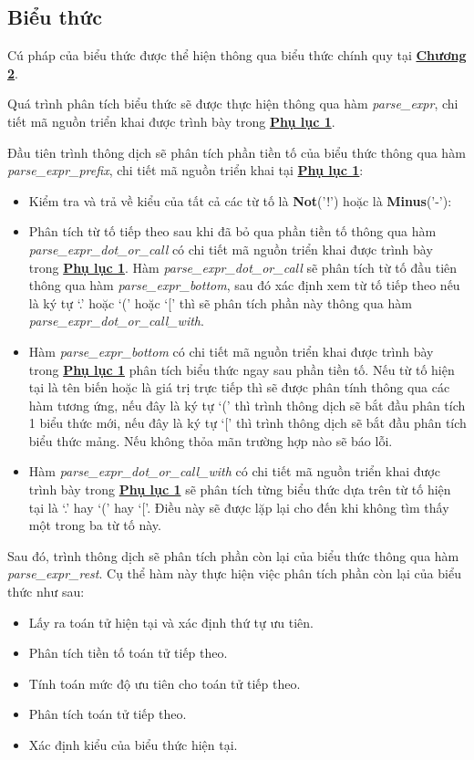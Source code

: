 \subsection{Biểu thức}
Cú pháp của biểu thức được thể hiện thông qua biểu thức chính quy tại \hyperref[ch2:expr]{\bf Chương 2}.

Quá trình phân tích biểu thức sẽ được thực hiện thông qua hàm \textit{parse\_expr}, chi tiết mã nguồn triển khai được trình bày trong \hyperref[ap1:expr]{\bf Phụ lục 1}. %

Đầu tiên trình thông dịch sẽ phân tích phần tiền tố của biểu thức thông qua hàm \\\textit{parse\_expr\_prefix}, chi tiết mã nguồn triển khai tại \hyperref[ap1:expr_prefix]{\bf Phụ lục 1}:
\begin{itemize}
    \item Kiểm tra và trả về kiểu của tất cả các từ tố là \textbf{Not}('!') hoặc là \textbf{Minus}('-'):
    \item Phân tích từ tố tiếp theo sau khi đã bỏ qua phần tiền tố thông qua hàm \textit{parse\_expr\_dot\_or\_call} có chi tiết mã nguồn triển khai được trình bày trong \hyperref[ap1:expr_dot_or_call]{\bf Phụ lục 1}. Hàm \textit{parse\_expr\_dot\_or\_call} sẽ phân tích từ tố đầu tiên thông qua hàm \textit{parse\_expr\_bottom}, sau đó xác định xem từ tố tiếp theo nếu là ký tự `.' hoặc `(' hoặc `[' thì sẽ phân tích phần này thông qua hàm \textit{parse\_expr\_dot\_or\_call\_with}. %
    \item Hàm \textit{parse\_expr\_bottom} có chi tiết mã nguồn triển khai được trình bày trong \hyperref[ap1:expr_bottom]{\bf Phụ lục 1} phân tích biểu thức ngay sau phần tiền tố. Nếu từ tố hiện tại là tên biến hoặc là giá trị trực tiếp thì sẽ được phân tính thông qua các hàm tương ứng, nếu đây là ký tự `(' thì trình thông dịch sẽ bắt đầu phân tích 1 biểu thức mới, nếu đây là ký tự `[' thì trình thông dịch sẽ bắt đầu phân tích biểu thức mảng. Nếu không thỏa mãn trường hợp nào sẽ báo lỗi. %
    \item Hàm \textit{parse\_expr\_dot\_or\_call\_with} có chi tiết mã nguồn triển khai được trình bày trong \hyperref[ap1:expr_dot_or_call_with]{\bf Phụ lục 1} sẽ phân tích từng biểu thức dựa trên từ tố hiện tại là `.' hay `(' hay `['. Điều này sẽ được lặp lại cho đến khi không tìm thấy một trong ba từ tố này. %
\end{itemize}
Sau đó, trình thông dịch sẽ phân tích phần còn lại của biểu thức thông qua hàm \textit{parse\_expr\_rest}. Cụ thể hàm này thực hiện việc phân tích phần còn lại của biểu thức như sau:
\begin{itemize}
    \item Lấy ra toán tử hiện tại và xác định thứ tự ưu tiên.
    \item Phân tích tiền tố toán tử tiếp theo.
    \item Tính toán mức độ ưu tiên cho toán tử tiếp theo.
    \item Phân tích toán tử tiếp theo.
    \item Xác định kiểu của biểu thức hiện tại.
\end{itemize}


